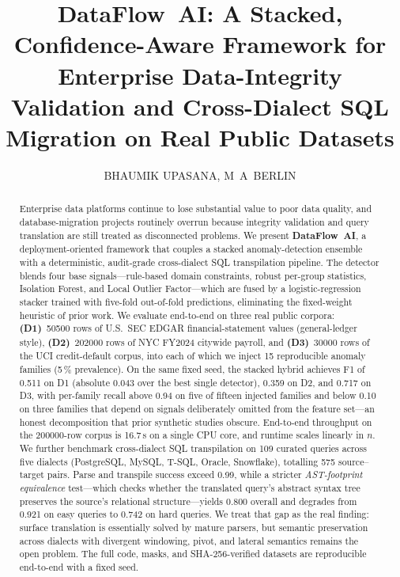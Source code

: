 \documentclass{ieeeaccess}
\begin{document}

\title{DataFlow~AI: A Stacked, Confidence-Aware Framework for Enterprise Data-Integrity Validation and Cross-Dialect SQL Migration on Real Public Datasets}

\author{
  \uppercase{Bhaumik Upasana},
  \uppercase{M~A~Berlin}
}
\address[1,2]{School of Computer Science and Engineering (SCOPE), Vellore Institute of Technology (VIT),
Vellore, Tamil Nadu 632\,014, India}

\begin{abstract}
Enterprise data platforms continue to lose substantial value to poor data quality, and database-migration projects
routinely overrun because integrity validation and query translation are still treated as disconnected problems.
We present \textbf{DataFlow~AI}, a deployment-oriented framework that couples a stacked anomaly-detection
ensemble with a deterministic, audit-grade cross-dialect SQL transpilation pipeline. The detector blends four base
signals---rule-based domain constraints, robust per-group statistics, Isolation Forest, and Local Outlier
Factor---which are fused by a logistic-regression stacker trained with five-fold out-of-fold predictions, eliminating
the fixed-weight heuristic of prior work. We evaluate end-to-end on three real public corpora:
\textbf{(D1)}~\num{50500} rows of U.S.\ SEC EDGAR financial-statement values (general-ledger style),
\textbf{(D2)}~\num{202000} rows of NYC FY2024 citywide payroll, and
\textbf{(D3)}~\num{30000} rows of the UCI credit-default corpus, into each of which we inject 15 reproducible
anomaly families (5\,\% prevalence). On the same fixed seed, the stacked hybrid achieves F1 of \num{0.511} on D1
(absolute \num{+0.043} over the best single detector), \num{0.359} on D2, and \num{0.717} on D3, with
per-family recall above \num{0.94} on five of fifteen injected families and below \num{0.10} on three families
that depend on signals deliberately omitted from the feature set---an honest decomposition that prior synthetic
studies obscure. End-to-end throughput on the \num{200000}-row corpus is \num{16.7}\,s on a single CPU core, and
runtime scales linearly in $n$. We further benchmark cross-dialect SQL transpilation on \num{109} curated queries
across five dialects (PostgreSQL, MySQL, T-SQL, Oracle, Snowflake), totalling \num{575} source--target pairs.
Parse and transpile success exceed \num{0.99}, while a stricter \textit{AST-footprint equivalence} test---which
checks whether the translated query's abstract syntax tree preserves the source's relational structure---yields
\num{0.800} overall and degrades from \num{0.921} on easy queries to \num{0.742} on hard queries. We treat that
gap as the real finding: surface translation is essentially solved by mature parsers, but semantic preservation
across dialects with divergent windowing, pivot, and lateral semantics remains the open problem. The full code,
masks, and SHA-256-verified datasets are reproducible end-to-end with a fixed seed.
\end{abstract}
\end{document}
